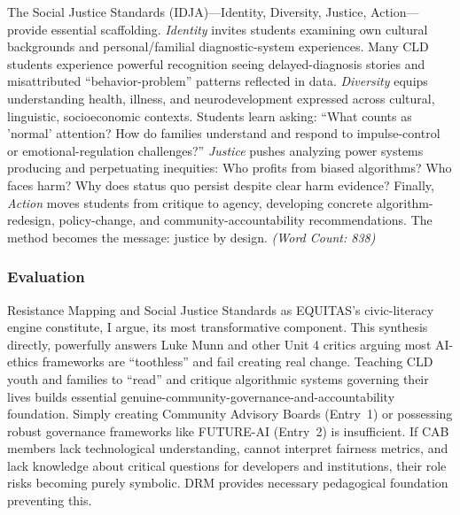 \documentclass[11pt,twoside]{article}
\begin{document}
The Social Justice Standards (IDJA)---Identity, Diversity, Justice, Action---provide essential scaffolding. \textit{Identity} invites students examining own cultural backgrounds and personal/familial diagnostic-system experiences. Many CLD students experience powerful recognition seeing delayed-diagnosis stories and misattributed ``behavior-problem'' patterns reflected in data. \textit{Diversity} equips understanding health, illness, and neurodevelopment expressed across cultural, linguistic, socioeconomic contexts. Students learn asking: ``What counts as 'normal' attention? How do families understand and respond to impulse-control or emotional-regulation challenges?'' \textit{Justice} pushes analyzing power systems producing and perpetuating inequities: Who profits from biased algorithms? Who faces harm? Why does status quo persist despite clear harm evidence? Finally, \textit{Action} moves students from critique to agency, developing concrete algorithm-redesign, policy-change, and community-accountability recommendations. The method becomes the message: justice by design. \textit{(Word Count: 838)}

\newpage

\subsubsection*{Evaluation}

\vspace{-0.3cm}

Resistance Mapping and Social Justice Standards as EQUITAS's civic-literacy engine constitute, I argue, its most transformative component. This synthesis directly, powerfully answers Luke Munn and other Unit 4 critics arguing most AI-ethics frameworks are ``toothless'' and fail creating real change. Teaching CLD youth and families to ``read'' and critique algorithmic systems governing their lives builds essential genuine-community-governance-and-accountability foundation. Simply creating Community Advisory Boards (Entry~1) or possessing robust governance frameworks like FUTURE-AI (Entry~2) is insufficient. If CAB members lack technological understanding, cannot interpret fairness metrics, and lack knowledge about critical questions for developers and institutions, their role risks becoming purely symbolic. DRM provides necessary pedagogical foundation preventing this.
\end{document}
